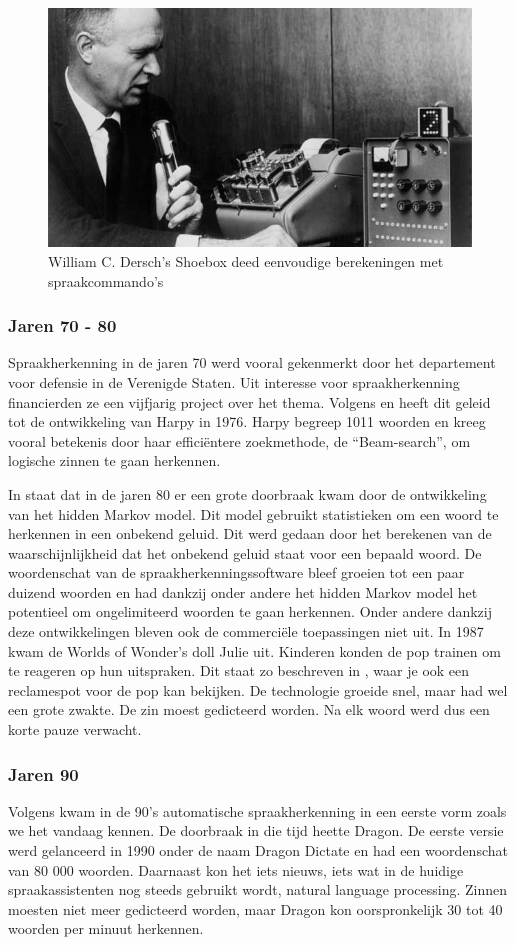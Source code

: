 \begin{figure}[h]
    \includegraphics[width=0.7\linewidth]{img/Shoebox}
    \caption{William C. Dersch’s Shoebox deed eenvoudige berekeningen met spraakcommando's \autocite{IBM2011}}
    \label{fig:shoebox}
\end{figure}

\subsubsection{Jaren 70 - 80}
Spraakherkenning in de jaren 70 werd vooral gekenmerkt door het departement voor defensie in de Verenigde Staten. Uit interesse voor spraakherkenning financierden ze een vijfjarig project over het thema. Volgens \autocite{Pinola2011} en \autocite{Kincaid2018} heeft dit geleid tot de ontwikkeling van Harpy in 1976. Harpy begreep 1011 woorden en kreeg vooral betekenis door haar efficiëntere zoekmethode, de ``Beam-search'', om logische zinnen te gaan herkennen.

In \autocite{Pinola2011} staat dat in de jaren 80 er een grote doorbraak kwam door de ontwikkeling van het hidden Markov model. Dit model gebruikt statistieken om een woord te herkennen in een onbekend geluid. Dit werd gedaan door het berekenen van de waarschijnlijkheid dat het onbekend geluid staat voor een bepaald woord. De woordenschat van de spraakherkenningssoftware bleef groeien tot een paar duizend woorden en had dankzij onder andere het hidden Markov model het potentieel om ongelimiteerd woorden te gaan herkennen.
Onder andere dankzij deze ontwikkelingen bleven ook de commerciële toepassingen niet uit. In 1987 kwam de Worlds of Wonder's doll Julie uit. Kinderen konden de pop trainen om te reageren op hun uitspraken. Dit staat zo beschreven in \autocite{Pinola2011}, waar je ook een reclamespot voor de pop kan bekijken. De technologie groeide snel, maar had wel een grote zwakte. De zin moest gedicteerd worden. Na elk woord werd dus een korte pauze verwacht.

\subsubsection{Jaren 90}
Volgens \autocite{Kincaid2018} kwam in de 90's automatische spraakherkenning in een eerste vorm zoals we het vandaag kennen. De doorbraak in die tijd heette Dragon. De eerste versie werd gelanceerd in 1990 onder de naam Dragon Dictate en had een woordenschat van 80 000 woorden. Daarnaast kon het iets nieuws, iets wat in de huidige spraakassistenten nog steeds gebruikt wordt, natural language processing. Zinnen moesten niet meer gedicteerd worden, maar Dragon kon oorspronkelijk 30 tot 40 woorden per minuut herkennen.


